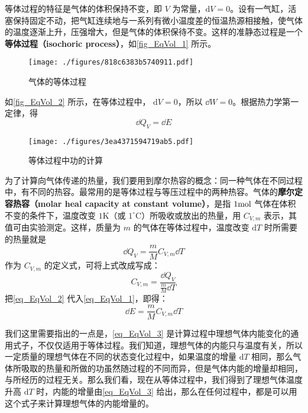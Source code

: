 

等体过程的特征是气体的体积保持不变，即 $V $ 为常量，$\mathrm dV=0$。设有一气缸，活塞保持固定不动，把气缸连续地与一系列有微小温度差的恒温热源相接触，使气体的温度逐渐上升，压强增大，但是气体的体积保待不变。这样的准静态过程是一个\textbf{等体过程（isochoric process）}，如\autoref{fig_EqVol_1} 所示。
\begin{figure}[ht]
\centering
\texttt{[image: ./figures/818c6383b5740911.pdf]}
\caption{气体的等体过程} \label{fig_EqVol_1}
\end{figure}
如\autoref{fig_EqVol_2} 所示，在等体过程中， $\mathrm dV=0$，所以 $\dd W=0$。根据热力学第一定律，得
\begin{equation} \label{eq_EqVol_1}
\dd Q_{V}=\dd E 
\end{equation}
\begin{figure}[ht]
\centering
\texttt{[image: ./figures/3ea4371594719ab5.pdf]}
\caption{等体过程中功的计算} \label{fig_EqVol_2}
\end{figure}
为了计算向气体传递的热量，我们要用到摩尔热容的概念：同一种气体在不同过程中，有不同的热容。最常用的是等体过程与等压过程中的两种热容。气体的\textbf{摩尔定容热容（molar heal capacity at constant volume）}，是指 $1 \rm mol$ 气体在体积不变的条件下，温度改变 $1\mathrm{K}$（或 $1^\circ \mathrm{C}$）所吸收或放出的热量，用 $C_{V,m}$ 表示，其值可由实验测定。这样，质量为 $m $ 的气体在等体过程中，温度改变 $\mathrm dT $ 时所需要的热量就是
\begin{equation} \label{eq_EqVol_2}
\dd Q_{V}=\frac{m}{M} C_{V, {m}} \dd T
\end{equation}
作为 $C_{V,m}$ 的定义式，可将上式改成写成：
\begin{equation} 
C_{V, m}=\frac{\dd Q_{V}}{\frac{m}{M} \dd T}
\end{equation}
把\autoref{eq_EqVol_2} 代入\autoref{eq_EqVol_1}，即得：
\begin{equation} \label{eq_EqVol_3}
\dd E=\frac{m}{M} C_{V, m} \dd T
\end{equation}

我们这里需要指出的一点是，\autoref{eq_EqVol_3} 是计算过程中理想气体内能变化的通用式子，不仅仅适用于等体过程。我们知道，理想气体的内能只与温度有关，所以一定质量的理想气体在不同的状态变化过程中，如果温度的增量 $\mathrm dT $ 相同，那么气体所吸取的热量和所做的功虽然随过程的不同而异，但是气体内能的增量却相同，与所经历的过程无关。那么我们看，现在从等体过程中，我们得到了理想气体温度升高 $\mathrm dT $ 时，内能的增量由\autoref{eq_EqVol_3} 给出，那么在任何过程中，都是可以用这个式子来计算理想气体的内能增量的。

